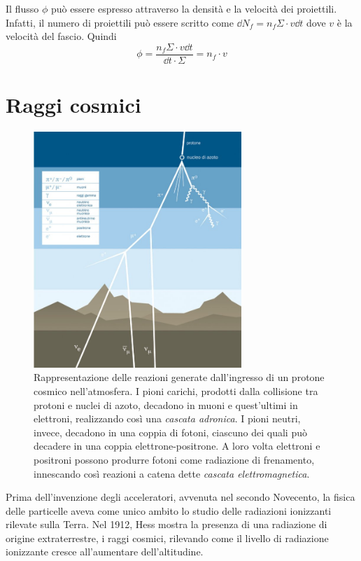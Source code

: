\documentclass[../main.tex]{subfiles}
\begin{document}
Il flusso $\phi$ può essere espresso attraverso la densità e la velocità dei proiettili. Infatti, il numero di proiettili può essere scritto come $\dd N_f = n_f \Sigma \cdot v \dd t$ dove $v$ è la velocità del fascio. Quindi 
\begin{equation}
    \phi = \frac{n_f \Sigma \cdot v \dd t}{\dd t \cdot \Sigma} = n_f \cdot v
\end{equation}

\section{Raggi cosmici}

\begin{figure}[!b]
    \centering
    \includegraphics[width=0.7\textwidth]{cosmic.jpg}
    \caption{Rappresentazione delle reazioni generate dall'ingresso di un protone cosmico nell'atmosfera. I pioni carichi, prodotti dalla collisione tra protoni e nuclei di azoto, decadono in muoni e quest'ultimi in elettroni, realizzando così una \emph{cascata adronica}. I pioni neutri, invece, decadono in una coppia di fotoni, ciascuno dei quali può decadere in una coppia elettrone-positrone. A loro volta elettroni e positroni possono produrre fotoni come radiazione di frenamento, innescando così reazioni a catena dette \emph{cascata elettromagnetica}.
    \cite{as10_vdu}}
    \label{fig:cosmic}
\end{figure}

Prima dell'invenzione degli acceleratori, avvenuta nel secondo Novecento, la fisica delle particelle aveva come unico ambito lo studio delle radiazioni ionizzanti rilevate sulla Terra.
Nel 1912, Hess mostra la presenza di una radiazione di origine extraterrestre, i raggi cosmici, rilevando come il livello di radiazione ionizzante cresce all'aumentare dell'altitudine.
\end{document}

